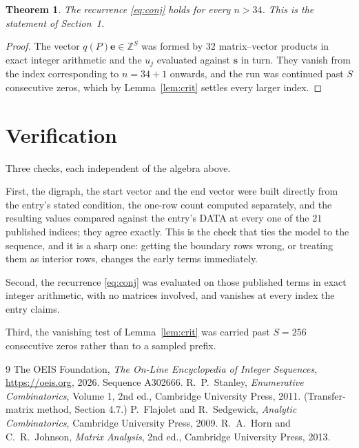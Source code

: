 \documentclass[11pt,a4paper]{article}
\theoremstyle{plain}
\newtheorem{theorem}{Theorem}
\theoremstyle{definition}
\begin{document}
\begin{theorem}
The recurrence \eqref{eq:conj} holds for every $n>34$. This is the statement of
Section~1.
\end{theorem}

\begin{proof}
The vector $q(P)\mathbf{e}\in\mathbb{Z}^{S}$ was formed by $32$ matrix--vector
products in exact integer arithmetic and the $u_j$ evaluated against $\mathbf{s}$ in turn.
They vanish from the index corresponding to $n=34+1$ onwards, and the run was continued
past $S$ consecutive zeros, which by Lemma~\ref{lem:crit} settles every larger index.
\end{proof}

\section{Verification}

Three checks, each independent of the algebra above.

First, the digraph, the start vector and the end vector were built directly from the
entry's stated condition, the one-row count computed separately, and the resulting values
compared against the entry's DATA at every one of the $21$ published indices; they
agree exactly. This is the check that ties the model to the sequence, and it is a sharp one:
getting the boundary rows wrong, or treating them as interior rows, changes the early terms
immediately.

Second, the recurrence \eqref{eq:conj} was evaluated on those published terms in exact
integer arithmetic, with no matrices involved, and vanishes at every index the entry claims.

Third, the vanishing test of Lemma~\ref{lem:crit} was carried past $S=256$ consecutive
zeros rather than to a sampled prefix.

\begin{thebibliography}{9}
 The OEIS Foundation, \emph{The On-Line Encyclopedia of Integer
Sequences}, \url{https://oeis.org}, 2026. Sequence A302666.
 R.~P.~Stanley, \emph{Enumerative Combinatorics}, Volume 1, 2nd ed.,
Cambridge University Press, 2011. (Transfer-matrix method, Section 4.7.)
 P.~Flajolet and R.~Sedgewick, \emph{Analytic Combinatorics}, Cambridge
University Press, 2009.
 R.~A.~Horn and C.~R.~Johnson, \emph{Matrix Analysis}, 2nd ed., Cambridge
University Press, 2013.
\end{thebibliography}
\end{document}
